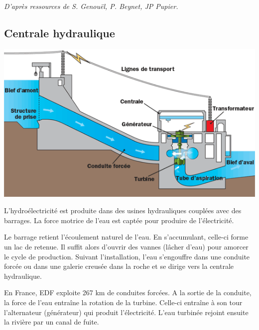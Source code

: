 \documentclass[10pt]{article}
\begin{document}
\begin{flushright}
\textit{D'après ressources de S. Genouël, P. Beynet, JP Pupier.}
\end{flushright}


\subsection*{Centrale hydraulique}
\setcounter{subparagraph}{0}

\begin{minipage}[c]{.45\linewidth}
\begin{center}
\includegraphics[width=.95\textwidth]{images/fig01_1}
\end{center}
\end{minipage} 
\hfill
\begin{minipage}[c]{.52\linewidth}
L'hydroélectricité est produite dans des usines hydrauliques couplées avec des barrages. La force motrice de l'eau est captée pour produire de l'électricité.

Le barrage retient l'écoulement naturel de l'eau. En s'accumulant, celle-ci forme un lac de retenue. Il suffit alors d'ouvrir des vannes (lâcher d'eau) pour amorcer le cycle de production. Suivant l'installation, l'eau s'engouffre dans une conduite forcée ou dans une galerie creusée dans la roche et se dirige vers la centrale hydraulique.

En France, EDF exploite 267 km de conduites forcées. A la sortie de la conduite, la force de l'eau entraîne la rotation de la turbine. Celle-ci entraîne à son tour l'alternateur (générateur) qui produit l'électricité. L'eau turbinée rejoint ensuite la rivière par un canal de fuite.

\end{minipage}
\end{document}
